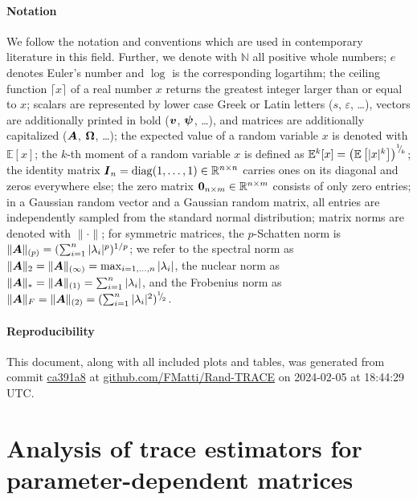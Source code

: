 \documentclass[12pt]{article}
\begin{document}
\paragraph{Notation}
We follow the notation and conventions which are used in contemporary literature in this field. Further, we denote with $\mathbb{N}$ all positive whole numbers; $e$ denotes Euler's number and $\log$ is the corresponding logartihm; the ceiling function $\lceil x \rceil$ of a real number $x$ returns the greatest integer larger than or equal to $x$; scalars are represented by lower case Greek or Latin letters ($s$, $\varepsilon$, \dots), vectors are additionally printed in bold ($\boldsymbol{v}$, $\boldsymbol{\psi}$, \dots), and matrices are additionally capitalized ($\boldsymbol{A}$, $\boldsymbol{\Omega}$, \dots); the expected value of a random variable $x$ is denoted with $\mathbb{E}[x]$; the $k$-th moment of a random variable $x$ is defined as $\mathbb{E}^{k}[x] = \left(\mathbb{E}\left[ | x |^{k} \right] \right)^{{}^{1}{\mskip -5mu/\mskip -3mu}_{k}}$; the identity matrix $\boldsymbol{I}_n = \operatorname{diag}(1, \dots, 1) \in \mathbb{R}^{n \times n}$ carries ones on its diagonal and zeros everywhere else; the zero matrix $\boldsymbol{0}_{n \times m} \in \mathbb{R}^{n \times m}$ consists of only zero entries; in a Gaussian random vector and a Gaussian random matrix, all entries are independently sampled from the standard normal distribution; matrix norms are denoted with $\lVert \cdot \rVert$; for symmetric matrices, the $p$-Schatten norm is $\lVert \boldsymbol{A} \rVert _{(p)} = (\sum_{i=1}^n |\lambda_i|^p)^{1/p}$; we refer to the spectral norm as $\lVert \boldsymbol{A} \rVert _2 = \lVert \boldsymbol{A} \rVert _{(\infty)} = \max_{i=1,\dots,n}|\lambda_i|$, the nuclear norm as $\lVert \boldsymbol{A} \rVert _{\ast} = \lVert \boldsymbol{A} \rVert _{(1)} = \sum_{i=1}^{n} |\lambda_i|$, and the Frobenius norm as $\lVert \boldsymbol{A} \rVert _F = \lVert \boldsymbol{A} \rVert _{(2)} = (\sum_{i=1}^{n} |\lambda_i|^2)^{{}^{1}{\mskip -5mu/\mskip -3mu}_{2}}$.

\paragraph{Reproducibility} This document, along with all included plots and tables, was generated from commit \href{https://github.com/FMatti/Rand-SD/tree/ca391a8}{ca391a8} at \href{https://github.com/FMatti/Rand-TRACE}{github.com/FMatti/Rand-TRACE} on 2024-02-05 at 18:44:29 UTC.

\section{Analysis of trace estimators for parameter-dependent matrices}
\label{sec:analysis}
\end{document}
